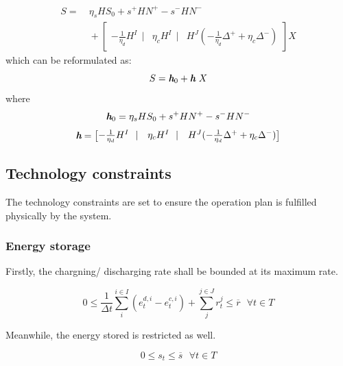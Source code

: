 \begin{equation}
\begin{aligned}
S = &~ \eta_s H S_0 + s^+ H N^+ - s^- H N^- \\
&~+ \begin{bmatrix}
-\frac{1}{\eta_d} H^I~~|& \eta_c H^I~~|& H^J (-\frac{1}{\eta_d} \Delta^{+} + \eta_c \Delta^{-})
\end{bmatrix} X
\end{aligned}
\end{equation}
which can be reformulated as:
\begin{equation}
\label{eq:state-EV-M-1}
S = \textit{\textbf{h}}_0 + \textit{\textbf{h}}~X
\end{equation}
where
\begin{equation}
\label{eq:state-EV-M-2}
\textit{\textbf{h}}_0 =  \eta_s H S_0 + s^+ H N^+ - s^- H N^-
\end{equation}
\begin{equation}
\label{eq:state-EV-M-3}
\textit{\textbf{h}} = \begin{bmatrix}
-\frac{1}{\eta_d} H^I~~|& \eta_c H^I~~|& H^J (-\frac{1}{\eta_d} \Delta^{+} + \eta_c \Delta^{-})
\end{bmatrix}
\end{equation}

\subsection{Technology constraints}

The technology constraints are set to ensure the operation plan is fulfilled physically by the system.

\subsubsection{Energy storage}
Firstly, the chargning/ discharging rate shall be bounded at its maximum rate.

\begin{equation}
0 \leq \frac{1}{\Delta t}\sum_{i}^{i \in I} (e^{d,i}_t - e^{c,i}_t) + \sum_{j}^{j \in J} r_t^j \leq \overline{r}~~~ \forall t \in T
\end{equation}

Meanwhile, the energy stored is restricted as well.

\begin{equation}
0 \leq s_t \leq \overline{s}~~~ \forall t \in T
\end{equation}

